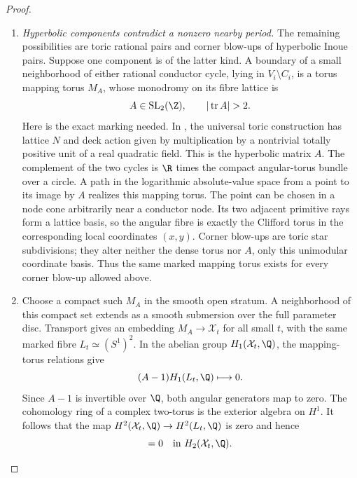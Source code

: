 \begin{proof}
\begin{enumerate}[label=\arabic*.,leftmargin=*]
\item \emph{Hyperbolic components contradict a nonzero nearby period.}
The remaining possibilities are toric rational pairs
and corner blow-ups of hyperbolic Inoue pairs. Suppose
one component is of the latter kind. A boundary of a
small neighborhood of either rational conductor cycle,
lying in $V_i\setminus C_i$, is a torus mapping torus
$M_A$, whose monodromy on its fibre lattice is
\begin{equation}
 A\in\operatorname{SL}_2(\Z),\qquad
 |\operatorname{tr}A|>2.
\label{pub:I:eq:B-4-28-6}
\end{equation}
Here is the exact marking needed. In
\citet[Section 15, Theorem 15.1 and the following
paragraph, retypeset pp.~130--131]{Oda1978D}, the universal
toric construction has lattice $N$ and deck action
given by multiplication by a nontrivial totally
positive unit of a real quadratic field. This is
the hyperbolic matrix $A$. The complement of the
two cycles is $\R$ times the compact angular-torus
bundle over a circle. A path in the logarithmic
absolute-value space from a point to its image by
$A$ realizes this mapping torus. The point can be
chosen in a node cone arbitrarily near a conductor
node. Its two adjacent primitive rays form a lattice
basis, so the angular fibre is exactly the Clifford
torus in the corresponding local coordinates
$(x,y)$. Corner blow-ups are toric star subdivisions;
they alter neither the dense torus nor $A$, only
this unimodular coordinate basis. Thus the same
marked mapping torus exists for every corner
blow-up allowed above.

\item Choose a compact such $M_A$ in the smooth open stratum.
A neighborhood of this compact set extends as a
smooth submersion over the full parameter disc.
Transport gives an embedding $M_A\to\mathcal X_t$ for
all small $t$, with the same marked fibre $L_t\simeq
(S^1)^2$. In the abelian group
$H_1(\mathcal X_t,\Q)$, the mapping-torus relations give
\[
 (A-1)H_1(L_t,\Q)\longmapsto0.
\]
Since $A-1$ is invertible over $\Q$, both angular
generators map to zero. The cohomology ring of a
complex two-torus is the exterior algebra on $H^1$.
It follows that the map $H^2(\mathcal X_t,\Q)\to
H^2(L_t,\Q)$ is zero and hence
\begin{equation}
 [L_t]=0\quad\hbox{in }H_2(\mathcal X_t,\Q).
\label{pub:I:eq:B-4-28-7}
\end{equation}


\end{enumerate}
\end{proof}
